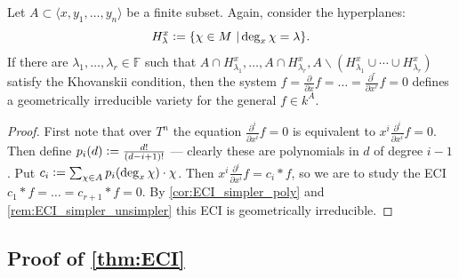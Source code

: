 \begin{example}
    Let $A \subset \langle x, y_1, \dots, y_n \rangle$ be a finite subset. Again, consider the hyperplanes:
    \[
    H^x_\lambda \vcentcolon= \{ \chi \in M\ | \deg_x \chi = \lambda \}.
    \]
    If there are $\lambda_1, \dots, \lambda_r \in \mathbb F$ such that $A \cap H^x_{\lambda_1}, \dots, A \cap H^x_{\lambda_r}, A \backslash (H^x_{\lambda_1} \cup \cdots \cup H^x_{\lambda_r})$ satisfy the Khovanskii condition, then the system $f = \frac{\partial}{\partial x} f = \dots = \frac{\partial^r}{\partial x^r} f = 0$ defines a geometrically irreducible variety for the general $f \in k^A$.
\end{example}
\begin{proof}
    First note that over $T^n$ the equation $\frac{\partial^i}{\partial x^i} f = 0$ is equivalent to $x^i \frac{\partial^i}{\partial x^i} f = 0$. Then define $p_i(d) \vcentcolon= \frac{d!}{(d - i + 1)!}$ --- clearly these are polynomials in $d$ of degree $i - 1$. Put $c_i \vcentcolon= \sum_{\chi \in A} p_i(\deg_x \chi) \cdot \chi$. Then $x^i \frac{\partial^i}{\partial x^i} f = c_i * f$, so we are to study the ECI $c_1 * f = \dots = c_{r + 1} * f = 0$. By \autoref{cor:ECI_simpler_poly} and \autoref{rem:ECI_simpler_unsimpler} this ECI is geometrically irreducible.
\end{proof}





\subsection{Proof of \autoref{thm:ECI}}\label{ssec:ECI_proof}

